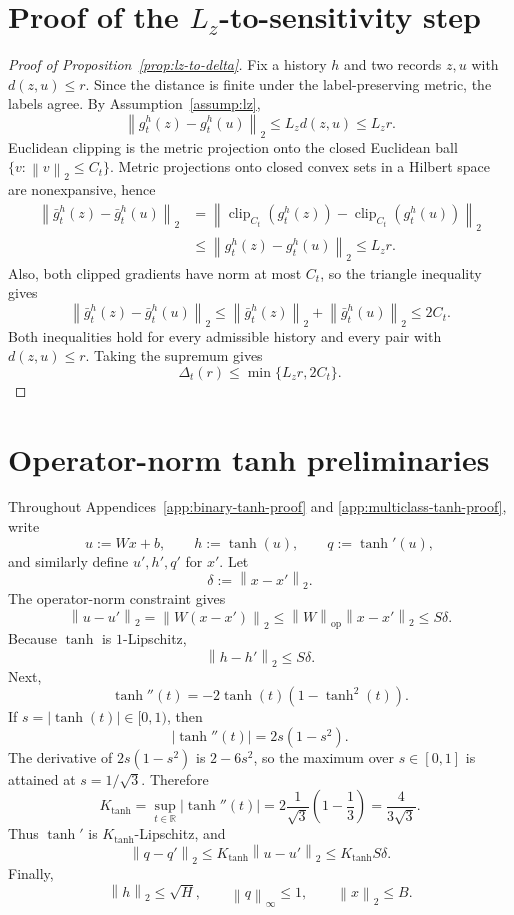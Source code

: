 \documentclass[11pt,a4paper]{report}
\theoremstyle{plain}
\theoremstyle{definition}
\theoremstyle{remark}
\DeclareMathOperator{\clip}{clip}
\newcommand{\R}{\mathbb{R}}
\newcommand{\op}{\mathrm{op}}
\newcommand{\norm}[1]{\left\lVert #1\right\rVert}
\begin{document}
\section{Proof of the \texorpdfstring{$L_z$}{Lz}-to-sensitivity step}
\label{app:lz-to-delta-proof}

\begin{proof}[Proof of Proposition~\ref{prop:lz-to-delta}]
Fix a history $h$ and two records $z,u$ with $d(z,u)\le r$.  Since the distance
is finite under the label-preserving metric, the labels agree.  By
Assumption~\ref{assump:lz},
\[
\norm{g_t^h(z)-g_t^h(u)}_2
\le
L_z d(z,u)
\le
L_z r.
\]
Euclidean clipping is the metric projection onto the closed Euclidean ball
$\{v:\norm{v}_2\le C_t\}$.  Metric projections onto closed convex sets in a
Hilbert space are nonexpansive, hence
\begin{align*}
\norm{\bar g_t^h(z)-\bar g_t^h(u)}_2
&=
\norm{\clip_{C_t}(g_t^h(z))-\clip_{C_t}(g_t^h(u))}_2\\
&\le
\norm{g_t^h(z)-g_t^h(u)}_2
\le
L_zr.
\end{align*}
Also, both clipped gradients have norm at most $C_t$, so the triangle
inequality gives
\[
\norm{\bar g_t^h(z)-\bar g_t^h(u)}_2
\le
\norm{\bar g_t^h(z)}_2+
\norm{\bar g_t^h(u)}_2
\le
2C_t.
\]
Both inequalities hold for every admissible history and every pair with
$d(z,u)\le r$.  Taking the supremum gives
\[
\Delta_t(r)\le\min\{L_zr,2C_t\}.
\]
\end{proof}

\section{Operator-norm tanh preliminaries}
\label{app:tanh-preliminaries}

Throughout Appendices~\ref{app:binary-tanh-proof} and
\ref{app:multiclass-tanh-proof}, write
\[
u:=Wx+b,
\qquad
h:=\tanh(u),
\qquad
q:=\tanh'(u),
\]
and similarly define $u',h',q'$ for $x'$.  Let
\[
\delta:=\norm{x-x'}_2.
\]
The operator-norm constraint gives
\[
\norm{u-u'}_2
=
\norm{W(x-x')}_2
\le
\norm{W}_{\op}\norm{x-x'}_2
\le
S\delta.
\]
Because $\tanh$ is $1$-Lipschitz,
\begin{equation}
\label{eq:tanh-h-diff}
\norm{h-h'}_2\le S\delta.
\end{equation}
Next,
\[
\tanh''(t)=-2\tanh(t)(1-\tanh^2(t)).
\]
If $s=|\tanh(t)|\in[0,1)$, then
\[
|\tanh''(t)|=2s(1-s^2).
\]
The derivative of $2s(1-s^2)$ is $2-6s^2$, so the maximum over $s\in[0,1]$ is
attained at $s=1/\sqrt3$.  Therefore
\[
K_{\tanh}=
\sup_{t\in\R}|\tanh''(t)|
=
2\frac1{\sqrt3}\left(1-\frac13\right)
=
\frac4{3\sqrt3}.
\]
Thus $\tanh'$ is $K_{\tanh}$-Lipschitz, and
\begin{equation}
\label{eq:tanh-q-diff}
\norm{q-q'}_2
\le
K_{\tanh}\norm{u-u'}_2
\le
K_{\tanh}S\delta.
\end{equation}
Finally,
\[
\norm{h}_2\le\sqrt H,
\qquad
\norm{q}_\infty\le1,
\qquad
\norm{x}_2\le B.
\]
\end{document}
